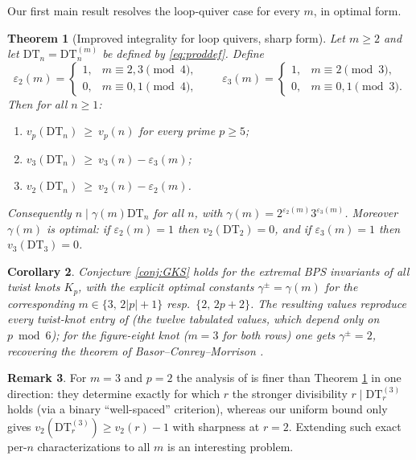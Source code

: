 \documentclass[11pt]{amsart}
\newtheorem{theorem}{Theorem}[section]
\newtheorem{corollary}[theorem]{Corollary}
\theoremstyle{definition}
\newtheorem{remark}[theorem]{Remark}
\newcommand{\DT}{\mathrm{DT}}
\newcommand{\vp}{v_p}
\begin{document}
Our first main result resolves the loop-quiver case for every $m$, in optimal form.

\begin{theorem}[Improved integrality for loop quivers, sharp form]\label{thm:main}
Let $m\ge2$ and let $\DT_n=\DT^{(m)}_n$ be defined by \eqref{eq:proddef}. Define
\[
\varepsilon_2(m)=\begin{cases}1,& m\equiv 2,3 \pmod 4,\\ 0,& m\equiv 0,1\pmod 4,\end{cases}
\qquad
\varepsilon_3(m)=\begin{cases}1,& m\equiv 2\pmod 3,\\ 0,& m\equiv 0,1 \pmod 3.\end{cases}
\]
Then for all $n\ge 1$:
\begin{enumerate}
\item $\vp(\DT_n)\ \ge\ \vp(n)$ for every prime $p\ge5$;
\item $v_3(\DT_n)\ \ge\ v_3(n)-\varepsilon_3(m)$;
\item $v_2(\DT_n)\ \ge\ v_2(n)-\varepsilon_2(m)$.
\end{enumerate}
Consequently $n \mid \gamma(m)\DT_n$ for all $n$, with $\gamma(m)=2^{\varepsilon_2(m)}3^{\varepsilon_3(m)}$. Moreover $\gamma(m)$ is optimal: if $\varepsilon_2(m)=1$ then $v_2(\DT_2)=0$, and if $\varepsilon_3(m)=1$ then $v_3(\DT_3)=0$.
\end{theorem}

\begin{corollary}\label{cor:knots}
Conjecture \ref{conj:GKS} holds for the extremal BPS invariants of all twist knots $K_p$, with the explicit optimal constants $\gamma^{\pm}=\gamma(m)$ for the corresponding $m\in\{3,\,2|p|+1\}$ resp.\ $\{2,\,2p+2\}$. The resulting values reproduce every twist-knot entry of \cite[Table~1]{GKS} (the twelve tabulated values, which depend only on $p\bmod 6$); for the figure-eight knot ($m=3$ for both rows) one gets $\gamma^\pm=2$, recovering the theorem of Basor--Conrey--Morrison \cite{BCM}.
\end{corollary}

\begin{remark}
For $m=3$ and $p=2$ the analysis of \cite{BCM} is finer than Theorem \ref{thm:main} in one direction: they determine exactly for which $r$ the stronger divisibility $r\mid \DT^{(3)}_r$ holds (via a binary ``well-spaced'' criterion), whereas our uniform bound only gives $v_2(\DT^{(3)}_r)\ge v_2(r)-1$ with sharpness at $r=2$. Extending such exact per-$n$ characterizations to all $m$ is an interesting problem.
\end{remark}
\end{document}
